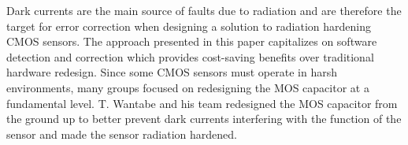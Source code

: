 \par Dark currents are the main source of faults due to radiation and are therefore the target for error correction when designing a solution to radiation hardening CMOS sensors. The approach presented in this paper capitalizes on software detection and correction which provides cost-saving benefits over traditional hardware redesign. Since some CMOS sensors must operate in harsh environments, many groups focused on redesigning the MOS capacitor at a fundamental level. T. Wantabe and his team redesigned the MOS capacitor from the ground up \cite{wantabe_takeuchi_ozawa_akahori_tsuchiya_2017} to better prevent dark currents interfering with the function of the sensor and made the sensor radiation hardened.